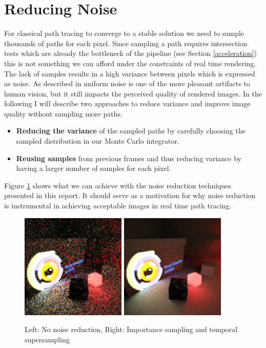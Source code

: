 \documentclass{ACGSeminar}
\begin{document}
\section{Reducing Noise} \label{noise}
For classical path tracing to converge to a stable solution we need to sample thousands of paths for each pixel. Since sampling a path requires intersection tests which are already the bottleneck of the pipeline (see Section \ref{acceleration}) this is not something we can afford under the constraints of real time rendering. The lack of samples results in a high variance between pixels which is expressed as noise. As described in \cite{PhysRevLett.78.1186} uniform noise is one of the more pleasant artifacts to human vision, but it still impacts the perceived quality of rendered images.
In the following I will describe two approaches to reduce variance and improve image quality without sampling more paths.
\begin{itemize}
\item \textbf{Reducing the variance} of the sampled paths by carefully choosing the sampled distribution in our Monte Carlo integrator.
\item \textbf{Reusing samples} from previous frames and thus reducing variance by having a larger number of samples for each pixel.
\end{itemize}

Figure \ref{fig:rendering-before-after} shows what we can achieve with the noise reduction techniques presented in this report. It should serve as a motivation for why noise reduction is instrumental in achieving acceptable images in real time path tracing.

\begin{figure}[htb!]
  \centering
  \includegraphics[width=5cm,natwidth=512,natheight=512]{figures/render_uniform.png}
  \includegraphics[width=5cm,natwidth=512,natheight=512]{figures/render_importancesample_txaa.png}
  \caption{Left: No noise reduction, Right: Importance sampling and temporal supersampling}
  \label{fig:rendering-before-after}
\end{figure}
\end{document}
